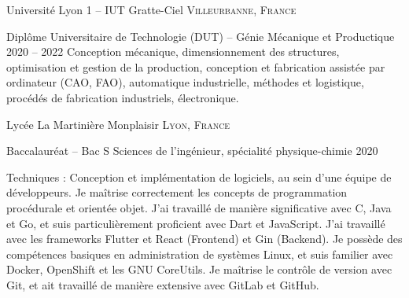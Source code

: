 \documentclass[10pt,a4paper]{article} %
\begin{document}

    \headedsection %
    {Université Lyon 1 -- IUT Gratte-Ciel}
    {\textsc{Villeurbanne, France}} {

        \headedsubsection %
        {Diplôme Universitaire de Technologie (DUT) -- Génie Mécanique et Productique}
        {2020 -- 2022}{\bodytext
        {Conception mécanique, dimensionnement des structures, optimisation et gestion de la production,
            conception et fabrication assistée par ordinateur (CAO, FAO), automatique industrielle,
            méthodes et logistique, procédés de fabrication industriels, électronique.}}
    }


    \headedsection %
    {Lycée La Martinière Monplaisir}
    {\textsc{Lyon, France}} {

        \headedsubsection %
        {Baccalauréat -- Bac S Sciences de l'ingénieur, spécialité physique-chimie}
        {2020} {}
    }

    \spacedhrule{0.5em}{-0.4em} %



    \inlineheadsection %
    {Techniques :}
    {Conception et implémentation de logiciels,
        au sein d'une équipe de développeurs. Je maîtrise correctement les concepts de programmation procédurale et
        orientée objet. J'ai travaillé de manière significative avec C, Java et Go,
        et suis particulièrement proficient avec Dart et JavaScript. J'ai travaillé avec les frameworks Flutter et React
        (Frontend)
        et Gin (Backend). Je possède des compétences basiques en administration de systèmes Linux,
        et suis familier avec Docker, OpenShift et les GNU CoreUtils. Je maîtrise le contrôle de version avec Git,
        et ait travaillé de manière extensive avec GitLab et GitHub. }
\end{document}
